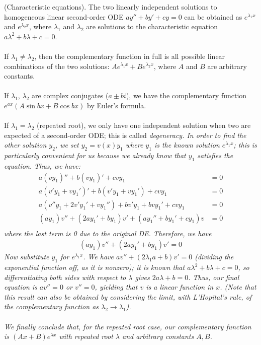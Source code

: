 \documentclass{article}
\begin{document}
\begin{method}
    (Characteristic equations). The two linearly independent solutions to homogeneous linear second-order ODE $ay''+by'+cy=0$ can be obtained as $e^{\lambda_1 x}$ and $e^{\lambda_2 x}$, where $\lambda_1$ and $\lambda_2$ are solutions to the characteristic equation $a\lambda^2+b\lambda+c=0$. \\ \\
    If $\lambda_1 \neq \lambda_2$, then the complementary function in full is all possible linear combinations of the two solutions: $Ae^{\lambda_1 x} + Be^{\lambda_2 x}$, where $A$ and $B$ are arbitrary constants. \\ \\
    If $\lambda_1$, $\lambda_2$ are complex conjugates ($a\pm bi$), we have the complementary function $e^{ax}(A \sin bx + B \cos bx)$ by Euler's formula. \\ \\
    If $\lambda_1 = \lambda_2$ (repeated root), we only have one independent solution when two are expected of a second-order ODE; this is called \it degeneracy. \normalfont In order to find the other solution $y_2$, we set $y_2 = v(x)y_1$ where $y_1$ is the known solution $e^{\lambda_1 x}$; this is particularly convenient for us because we already know that $y_1$ satisfies the equation. Thus, we have:
    \begin{equation*}
        \begin{aligned}
            a(vy_1)'' + b(vy_1)' + cvy_1 &= 0 \\
            a(v'y_1 + vy_1')' + b(v'y_1 + vy_1') + cvy_1 &= 0 \\
            a(v''y_1 + 2v'y_1' + vy_1'') + bv'y_1 + bvy_1' + cvy_1 &= 0 \\
            (ay_1)v'' + (2ay_1' + by_1)v' + (ay_1''+by_1'+cy_1)v &= 0 \\
        \end{aligned}
    \end{equation*}
    where the last term is 0 due to the original DE. Therefore, we have
    \begin{equation*}
        \begin{aligned}
            (ay_1)v'' + (2ay_1' + by_1)v' = 0
        \end{aligned}
    \end{equation*}
    Now substitute $y_1$ for $e^{\lambda_1 x}$. We have $av'' + (2\lambda_1 a + b)v' = 0$ (dividing the exponential function off, as it is nonzero); it is known that $a\lambda^2 + b\lambda + c = 0$, so differentiating both sides with respect to $\lambda$ gives $2a\lambda + b = 0$. Thus, our final equation is $av'' = 0$ or $v'' = 0$, yielding that $v$ is a linear function in $x$. (Note that this result can also be obtained by considering the limit, with L'Hopital's rule, of the complementary function as $\lambda_2 \to \lambda_1$). \\ \\
    We finally conclude that, for the repeated root case, our complementary function is $(Ax+B)e^{\lambda x}$ with repeated root $\lambda$ and arbitrary constants $A, B$.
\end{method}
\end{document}
